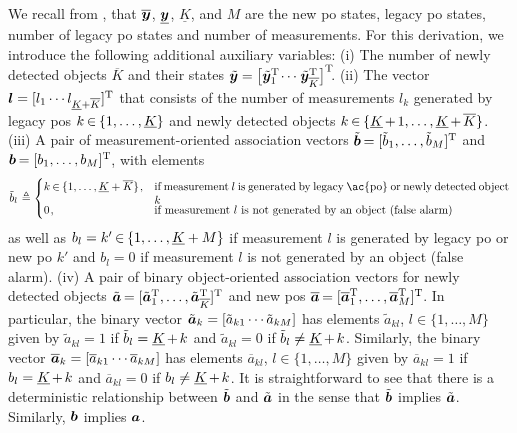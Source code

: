 \documentclass[11pt,a4paper]{article}
\newcommand{\ist}{\hspace*{.3mm}}
\newcommand{\rmv}{\hspace*{-.3mm}}
\newcommand{\rrmv}{\hspace*{-1mm}}
\newcommand{\T}{\text{T}}
\begin{document}
We recall from \cite[Section~II]{MeyWil:J21}, that $\overline{\bm{y}}$, $\underline{\bm{y}}$, $\underline{K}$, and $M$ are the new \ac{po} states, legacy \ac{po} states, number of legacy \ac{po} states and number of measurements. For this derivation, we introduce the following additional auxiliary variables: (i) The number of newly detected objects $\overline{K}$ and their states $\tilde{\V{y}} = \big[\tilde{\V{y}}^{\T}_1 \rmv\cdots\ist \tilde{\V{y}}^{\T}_{\overline{K}} \big]^{\T}\rrmv$. (ii) The vector $\V{l} = [l_1 \cdots l_{\underline{K}+\overline{K}}]^{\T}$ that consists of the number of measurements $l_k$ generated by legacy \acp{po} $k \rmv\in\rmv \{1,\dots,\underline{K}\}$ and newly detected objects $k \rmv\in\rmv \{\underline{K}\rmv+\rmv1,\dots,\underline{K}\rmv+\rmv\overline{K}\}$. (iii) A pair of measurement-oriented association vectors $\tilde{\V{b}} \rmv= [\tilde{b}_{1},\dots,\tilde{b}_{M}]^{\mathrm{T}}$ and $\V{b} \rmv= [b_{1},\dots,b_{M}]^{\mathrm{T}}\rmv$, with elements 
\begin{equation}
\tilde{b}_{l} \ist\triangleq \begin{cases} 
    k \rmv\in\rmv \{1,\dots,\underline{K} + \overline{K}\} \ist , & \begin{minipage}[t]{110mm}if measurement $l$ is generated by legacy \ac{po} or newly detected object $k$\end{minipage}\\[-.5mm]
   0 \ist, & \begin{minipage}[t]{110mm}if measurement $l$ is not generated by an object (false alarm)\end{minipage}
  \end{cases}
\vspace{0mm}
\end{equation}
as well as $b_{l} = k' \rmv\in\rmv \{1,\dots,\underline{K} + M\}$ if measurement $l$ is generated by legacy \ac{po} or new \ac{po} $k'$ and $b_{l} = 0$ if measurement $l$ is not generated by an object (false alarm). (iv) A pair of binary object-oriented association vectors for newly detected objects $\tilde{\V{a}} \rmv= [\tilde{\V{a}}^{\mathrm{T}}_{1},\dots,\tilde{\V{a}}^{\mathrm{T}}_{\overline{K}}]^{\mathrm{T}}$ and new \acp{po} $\overline{\V{a}} \rmv= [\overline{\V{a}}^{\mathrm{T}}_{1},\dots,\overline{\V{a}}^{\mathrm{T}}_{M}]^{\mathrm{T}}\rmv$. In particular, the binary vector $\tilde{\bm{a}}_k = [\tilde{a}_{k1} \cdots \tilde{a}_{kM} ]$ has elements $\tilde{a}_{kl}$, $l \in \{1,\dots,M\}$ given by $\tilde{a}_{kl} = 1$ if $\tilde{b}_l = \underline{K} \rmv+\rmv k$ and $\tilde{a}_{kl} = 0$ if $\tilde{b}_l \neq \underline{K} \rmv+\rmv k$. Similarly, the binary vector $\overline{\bm{a}}_k = [\overline{a}_{k1} \cdots \overline{a}_{kM} ]$ has elements $\overline{a}_{kl}$, $l \in \{1,\dots,M\}$ given by $\overline{a}_{kl} = 1$ if $b_l = \underline{K} \rmv+\rmv k$ and $\overline{a}_{kl} = 0$ if $b_l \neq \underline{K} \rmv+\rmv k$. It is straightforward to see that there is a deterministic relationship between $\tilde{\bm{b}}$ and  $\tilde{\bm{a}}$ in the sense that $\tilde{\bm{b}}$ implies $\tilde{\bm{a}}$. Similarly, $\bm{b}$ implies \vspace{2mm} $\bm{a}$.
\end{document}
